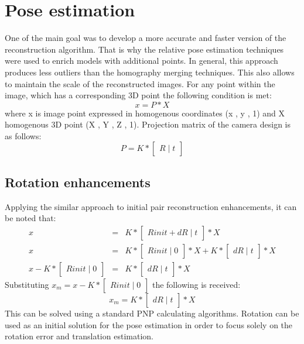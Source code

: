 \section{Pose estimation}
One of the main goal was to develop a more accurate and faster version of the reconstruction algorithm. That is why the relative pose estimation techniques were used to enrich models with additional points. In general, this approach produces less outliers than the homography merging techniques. This also allows to maintain the scale of the reconstructed images. For any point within the image, which has a corresponding 3D point the following condition is met:
\begin{equation} \label{eq:projectionEquation}
 x = P * X
\end{equation}
where x is image point expressed in homogenous coordinates (x , y , 1) and X homogenous 3D point (X , Y , Z , 1). 
Projection matrix of the camera design is as follows: 
\begin{equation} \label{eq:projectionEquation}
 P = K * \begin{bmatrix}R\mid t\end{bmatrix}
\end{equation}
\subsection{Rotation enhancements}
Applying the similar approach to initial pair reconstruction enhancements, it can be noted that:
\begin{equation} \label{eq:projectionRotError1}
\begin{array}{rcl}
 x & = & K * \begin{bmatrix}Rinit + dR\mid t\end{bmatrix} * X \\
 x & = & K * \begin{bmatrix}Rinit\mid 0\end{bmatrix} * X + K * \begin{bmatrix}dR\mid t\end{bmatrix} * X \\
 x - K * \begin{bmatrix}Rinit\mid 0\end{bmatrix} & = & K * \begin{bmatrix}dR\mid t\end{bmatrix} * X
\end{array}
\end{equation}
Substituting $x_{m} = x - K * \begin{bmatrix}Rinit\mid 0\end{bmatrix}$ the following is received: 
\begin{equation} \label{eq:projectionRotError2}
x_{m} = K * \begin{bmatrix}dR\mid t\end{bmatrix} * X
\end{equation}
This can be solved using a standard PNP calculating algorithms. Rotation can be used as an initial solution for the pose estimation in order to focus solely on the rotation error and translation estimation.
